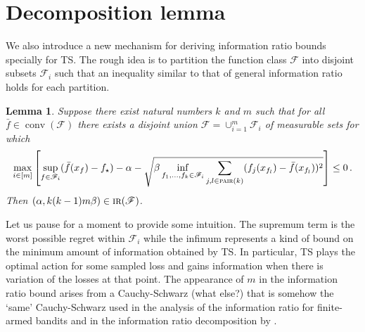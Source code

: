 \documentclass[letter, 12pt]{report}
\newcommand{\pair}{\operatorname{\textsc{pair}}}
\newcommand{\sF}{\mathscr F}
\newcommand{\conv}{\operatorname{conv}}
\newcommand{\1}{\mathbf{1}}
\newcommand{\IR}{\operatorname{\textsc{ir}}}
\newcommand{\ts}{\textsc{TS}\xspace}
\theoremstyle{plain}
\newtheorem{lemma}[theorem]{Lemma}
\theoremstyle{definition}
\theoremstyle{remark}
\begin{document}
\section{Decomposition lemma}
We also introduce a new mechanism for deriving information ratio bounds specially for \ts.
The rough idea is to partition the function class $\sF$ into disjoint subsets $\sF_i$ such that an inequality similar to that of general information ratio holds for each partition.
\begin{lemma}\label{lem:decomp-big}
    Suppose there exist natural numbers $k$ and $m$ such that for all $\bar f \in \conv(\sF)$ there exists a disjoint union $\sF = \cup_{i=1}^m \sF_i$ of measurable sets
    for which
    \begin{align*}
        \max_{i \in [m]} \left[\sup_{f \in \sF_i} (\bar f(x_f) - f_\star) - \alpha - \sqrt{\beta \inf_{f_1,\ldots,f_k \in \sF_i} \sum_{j,l \in \pair(k)} (f_j(x_{f_l}) - \bar f(x_{f_l}))^2} \right] \leq 0 \,.
    \end{align*}
    Then $(\alpha, k(k-1)m\beta) \in \IR(\sF)$.
\end{lemma}
Let us pause for a moment to provide some intuition.
The supremum term is the worst possible regret within $\sF_i$ while the infimum represents a kind of bound on the minimum amount of information obtained by \ts{}.
In particular, \ts{} plays the optimal action for some sampled loss and gains information when there is variation of the losses at that point.
The appearance of $m$ in the information ratio bound arises from a Cauchy-Schwarz (what else?) that is somehow the `same' Cauchy-Schwarz used in the analysis
of the information ratio for finite-armed bandits \citep{RV14} and in the information ratio decomposition by \cite{Lat20-cvx}.
\end{document}
